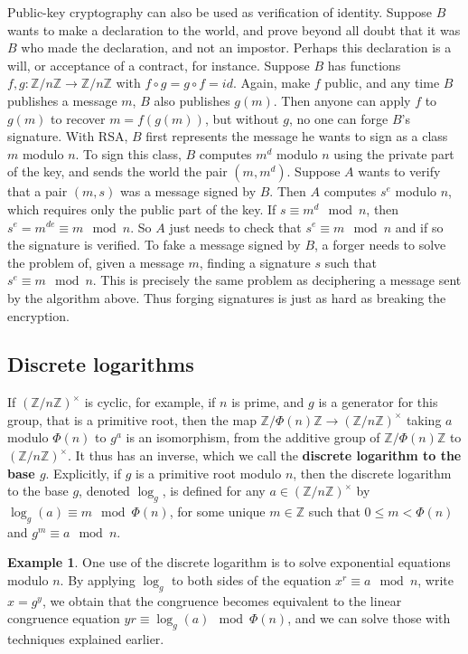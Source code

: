 \documentclass{article}
\newcommand{\Z}{\mathbb{Z}}
\newcommand{\rb}[1]{\left( #1 \right)}
\newcommand{\unit}[1]{\rb{\Z / #1\Z}^\times}
\theoremstyle{definition}\newtheorem{definition}{Definition}
\theoremstyle{definition}\newtheorem*{remark}{Remark}
\theoremstyle{definition}\newtheorem*{example}{Example}
\theoremstyle{definition}\newtheorem*{note}{Note}
\begin{document}
Public-key cryptography can also be used as verification of identity. Suppose $ B $ wants to make a declaration to the world, and prove beyond all doubt that it was $ B $ who made the declaration, and not an impostor. Perhaps this declaration is a will, or acceptance of a contract, for instance. Suppose $ B $ has functions $ f, g : \Z / n\Z \to \Z / n\Z $ with $ f \circ g = g \circ f = id $. Again, make $ f $ public, and any time $ B $ publishes a message $ m $, $ B $ also publishes $ g\rb{m} $. Then anyone can apply $ f $ to $ g\rb{m} $ to recover $ m = f\rb{g\rb{m}} $, but without $ g $, no one can forge $ B $'s signature. With RSA, $ B $ first represents the message he wants to sign as a class $ m $ modulo $ n $. To sign this class, $ B $ computes $ m^d $ modulo $ n $ using the private part of the key, and sends the world the pair $ \rb{m, m^d} $. Suppose $ A $ wants to verify that a pair $ \rb{m, s} $ was a message signed by $ B $. Then $ A $ computes $ s^e $ modulo $ n $, which requires only the public part of the key. If $ s \equiv m^d \mod n $, then $ s^e = m^{de} \equiv m \mod n $. So $ A $ just needs to check that $ s^e \equiv m \mod n $ and if so the signature is verified. To fake a message signed by $ B $, a forger needs to solve the problem of, given a message $ m $, finding a signature $ s $ such that $ s^e \equiv m \mod n $. This is precisely the same problem as deciphering a message sent by the algorithm above. Thus forging signatures is just as hard as breaking the encryption.

\subsection{Discrete logarithms}

If $ \unit{n} $ is cyclic, for example, if $ n $ is prime, and $ g $ is a generator for this group, that is a primitive root, then the map $ \Z / \Phi\rb{n}\Z \to \unit{n} $ taking $ a $ modulo $ \Phi\rb{n} $ to $ g^a $ is an isomorphism, from the additive group of $ \Z / \Phi\rb{n}\Z $ to $ \unit{n} $. It thus has an inverse, which we call the \textbf{discrete logarithm to the base $ g $}. Explicitly, if $ g $ is a primitive root modulo $ n $, then the discrete logarithm to the base $ g $, denoted $ \log_g $, is defined for any $ a \in \unit{n} $ by $ \log_g\rb{a} \equiv m \mod \Phi\rb{n} $, for some unique $ m \in \Z $ such that $ 0 \le m < \Phi\rb{n} $ and $ g^m \equiv a \mod n $.

\begin{example}
One use of the discrete logarithm is to solve exponential equations modulo $ n $. By applying $ \log_g $ to both sides of the equation $ x^r \equiv a \mod n $, write $ x = g^y $, we obtain that the congruence becomes equivalent to the linear congruence equation $ yr \equiv \log_g\rb{a} \mod \Phi\rb{n} $, and we can solve those with techniques explained earlier.
\end{example}
\end{document}
